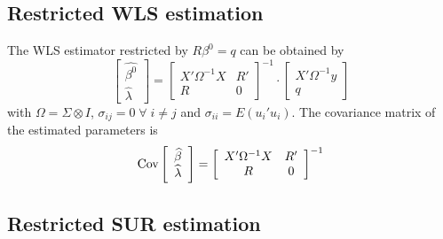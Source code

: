 \subsection{Restricted WLS estimation}

The WLS estimator restricted by $R \beta^0 = q$ can be obtained by
\begin{equation}
   \left[ \begin{array}{c}
      \widehat{\beta^0} \\ \widehat{\lambda}
   \end{array} \right]
   =
   \left[ \begin{array}{cc}
      X' \Omega^{-1} X & R' \\ 
      R & 0
   \end{array} \right]^{-1}
   \cdot
   \left[ \begin{array}{c}
      X' \Omega^{-1} y \\ q 
   \end{array} \right]
\end{equation}
with $\Omega = \Sigma \otimes I$, 
$\sigma_{ij} = 0 \; \forall \; i \neq j$ and
$\sigma_{ii} = E \left( u_i' u_i \right)$.
The covariance matrix of the estimated parameters is
\begin{equation}
   \text{Cov} 
   \left[ \begin{array}{c}
      \widehat{\beta} \\ \widehat{\lambda}
   \end{array} \right] 
   = 
   \left[ \begin{array}{cc}
      X' \Omega^{-1} X & R' \\ 
      R & 0
   \end{array} \right]^{-1}
\end{equation}

\subsection{Restricted SUR estimation}

